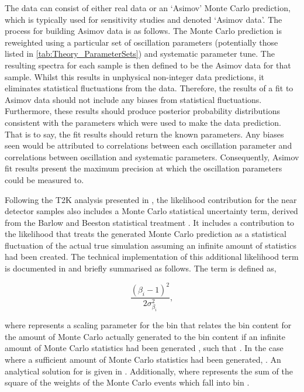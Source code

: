 The data can consist of either real data or an `Asimov' Monte Carlo prediction, which is typically used for sensitivity studies and denoted `Asimov data'. The process for building Asimov data is as follows. The Monte Carlo prediction is reweighted using a particular set of oscillation parameters (potentially those listed in \autoref{tab:Theory_ParameterSets}) and systematic parameter tune. The resulting spectra for each sample is then defined to be the Asimov data for that sample. Whilst this results in unphysical non-integer data predictions, it eliminates statistical fluctuations from the data. Therefore, the results of a fit to Asimov data should not include any biases from statistical fluctuations. Furthermore, these results should produce posterior probability distributions consistent with the parameters which were used to make the data prediction. That is to say, the fit results should return the known parameters. Any biases seen would be attributed to correlations between each oscillation parameter and correlations between oscillation and systematic parameters. Consequently, Asimov fit results present the maximum precision at which the oscillation parameters could be measured to.

Following the T2K analysis presented in \cite{Dunne2020-uf}, the likelihood contribution for the near detector samples also includes a Monte Carlo statistical uncertainty term, derived from the Barlow and Beeston statistical treatment \cite{Barlow1993-cc, Conway2011-go}. It includes a contribution to the likelihood that treats the generated Monte Carlo prediction as a statistical fluctuation of the actual true simulation assuming an infinite amount of statistics had been created. The technical implementation of this additional likelihood term is documented in \cite{t2k_tn_395} and briefly summarised as follows. The term is defined as,

\begin{equation}
  \frac{(\beta_{i}-1)^{2}}{2\sigma^{2}_{\beta_{i}}},
\end{equation}

where  represents a scaling parameter for the  bin that relates the bin content for the amount of Monte Carlo actually generated  to the bin content if an infinite amount of Monte Carlo statistics had been generated , such that . In the case where a sufficient amount of Monte Carlo statistics had been generated, . An analytical solution for  is given in \cite{t2k_tn_395}. Additionally,  where  represents the sum of the square of the weights of the Monte Carlo events which fall into bin .

